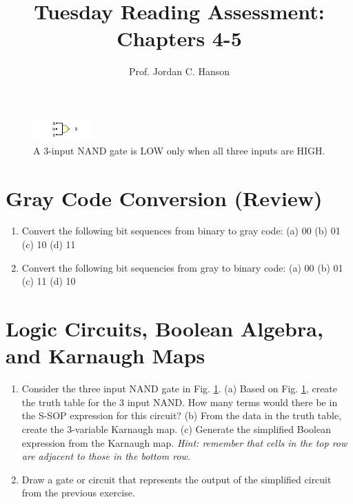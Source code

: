 \documentclass{article}
\begin{document}
\title{Tuesday Reading Assessment: Chapters 4-5}
\author{Prof. Jordan C. Hanson}

\maketitle

\begin{figure}[ht]
\centering
\includegraphics[width=0.2\textwidth]{figures/3_nand.png}
\caption{\label{fig:1} A 3-input NAND gate is LOW only when all three inputs are HIGH.}
\end{figure}

\section{Gray Code Conversion (Review)}

\begin{enumerate}
\item Convert the following bit sequences from binary to gray code: (a) 00 (b) 01 (c) 10 (d) 11 \\ \vspace{1cm}
\item Convert the following bit sequencies from gray to binary code: (a) 00 (b) 01 (c) 11 (d) 10 \\ \vspace{1cm}
\end{enumerate}

\section{Logic Circuits, Boolean Algebra, and Karnaugh Maps}

\begin{enumerate}
\item Consider the three input NAND gate in Fig. \ref{fig:1}.  (a) Based on Fig. \ref{fig:1}, create the truth table for the 3 input NAND.  How many terms would there be in the S-SOP expression for this circuit?  (b) From the data in the truth table, create the 3-variable Karnaugh map. (c) Generate the simplified Boolean expression from the Karnaugh map.  \textit{Hint: remember that cells in the top row are adjacent to those in the bottom row.} \\ \vspace{4cm}
\item Draw a gate or circuit that represents the output of the simplified circuit from the previous exercise.
\end{enumerate}
\end{document}

